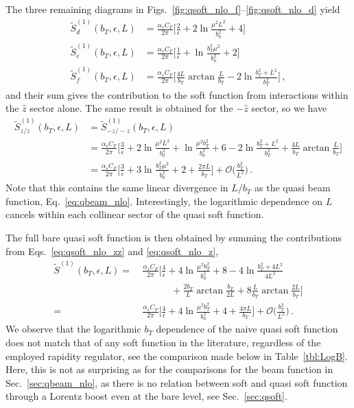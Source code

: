 \documentclass[11pt,a4paper]{article}
\DeclareRobustCommand{\eq}[1]{Eq.~\eqref{eq:#1}}
\DeclareRobustCommand{\eqs}[2]{Eqs.~\eqref{eq:#1} and \eqref{eq:#2}}
\DeclareRobustCommand{\sec}[1]{Sec.~\ref{sec:#1}}
\DeclareRobustCommand{\tbl}[1]{Table~\ref{tbl:#1}}
\newcommand{\eps}{\epsilon}
\newcommand{\cO}{\mathcal{O}}
\newcommand{\nn}{\nonumber}
\newcommand{\as}{\alpha_s}
\newcommand{\Lb}[1]{\ln^{#1}\frac{b_T^2 \mu^2}{b_0^2}}
\begin{document}
The three remaining diagrams in Figs.~\ref{fig:qsoft_nlo_f}--\ref{fig:qsoft_nlo_d} yield
\begin{align}
 \label{eq:qsoft_nlo_d}
 \tilde S_d^{(1)}(b_T,\eps,L) &
 =  \frac{\as C_F}{2 \pi} \biggl[ \frac{2}{\eps} + 2\ln\frac{\mu^2 L^2}{b_0^2} + 4 \biggr]
\\
 \label{eq:qsoft_nlo_e}
 \tilde S_e^{(1)}(b_T,\eps,L) &
 =  \frac{\as C_F}{2 \pi} \biggl[ \frac{1}{\eps} + \Lb{} + 2 \biggr]
\\
 \label{eq:qsoft_nlo_f}
 \tilde S_f^{(1)}(b_T,\eps,L) &
 = \frac{\as C_F}{2\pi} \biggl[ \frac{4 L}{b_T} \arctan\frac{L}{b_T} - 2 \ln\frac{b_T^2+L^2}{b_T^2} \biggr]
\,,\end{align}
and their sum gives the contribution to the soft function from
interactions within the $\hat z$ sector alone.
The same result is obtained for the $-\hat z$ sector, so we have
\begin{align} \label{eq:qsoft_nlo_z}
 \tilde S_{z/z}^{(1)}(b_T,\eps,L) &= \tilde S_{-z/-z}^{(1)}(b_T,\eps,L)
 \nn\\&
 = \frac{\as C_F}{2\pi} \biggl[
  \frac{3}{\eps} + 2\ln\frac{\mu^2 L^2}{b_0^2} + \ln\frac{\mu^2 b_T^2}{b_0^2} + 6
  - 2 \ln\frac{b_T^2+L^2}{b_T^2} + \frac{4 L}{b_T} \arctan\frac{L}{b_T}
  \biggr]
 \nn\\& =
 \frac{\as C_F}{2\pi} \biggl[
  \frac{3}{\eps} + 3\Lb{} + 2 + \frac{2\pi L}{b_T} \biggr] + \cO\biggl(\frac{b_T^2}{L^2}\biggr)
\,.\end{align}
Note that this contains the same linear divergence in $L/b_T$ as the quasi beam function,
\eq{qbeam_nlo}.
Interestingly, the logarithmic dependence on $L$ cancels within each collinear sector of the quasi soft function.

The full bare quasi soft function is then obtained by summing the contributions from \eqs{qsoft_nlo_zz}{qsoft_nlo_z},
\begin{align} \label{eq:qsoft_nlo}
 \tilde S^{(1)}(b_T, \eps, L)
 =~& \frac{\as C_F}{2\pi} \biggl[
  \frac{4}{\eps} + 4\ln\frac{\mu^2 b_T^2}{b_0^2} + 8
  -4 \ln\frac{b_T^2 + 4 L^2}{4 L^2}
  \nn\\&\qquad\quad
  + \frac{2 b_T}{L} \arctan\frac{b_T}{2L}
   + 8 \frac{L}{b_T} \arctan\frac{2L}{b_T}  \biggr]
\nn\\
 =
 ~&\frac{\as C_F}{2\pi} \biggl[ \frac{4}{\eps} + 4 \ln\frac{\mu^2 b_T^2}{b_0^2} + 4
  + \frac{4 \pi L}{b_T} \biggr] + \cO\biggl(\frac{b_T^2}{L^2}\biggr)
\,.\end{align}
We observe that the logarithmic $b_T$ dependence of the naive quasi soft function does not match that of any soft function in the literature, regardless of the employed rapidity regulator, see the comparison made below in \tbl{LogB}.
Here, this is not as surprising as for the comparisons for the beam function in \sec{qbeam_nlo}, as there is no relation between soft and quasi soft function through a Lorentz boost even at the bare level, see \sec{qsoft}.
\end{document}
